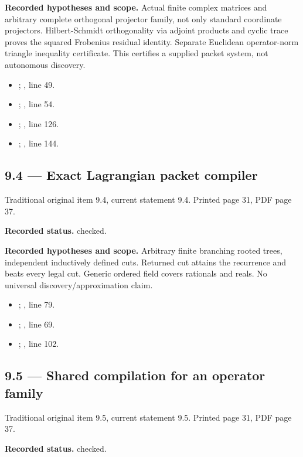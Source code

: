 \textbf{Recorded hypotheses and scope.} Actual finite complex matrices and arbitrary complete orthogonal projector family, not only standard coordinate projectors. Hilbert-Schmidt orthogonality via adjoint products and cyclic trace proves the squared Frobenius residual identity. Separate Euclidean operator-norm triangle inequality certificate. This certifies a supplied packet system, not autonomous discovery.

\begin{itemize}
\item {}; , line 49.
\item {}; , line 54.
\item {}; , line 126.
\item {}; , line 144.
\end{itemize}
\subsection{9.4 — Exact Lagrangian packet compiler}
\label{result:9.4}
{\footnotesize\color{muted}Traditional original item 9.4, current statement 9.4. Printed page 31, PDF page 37.}\par
\textbf{Recorded status.} checked.

\textbf{Recorded hypotheses and scope.} Arbitrary finite branching rooted trees, independent inductively defined cuts. Returned cut attains the recurrence and beats every legal cut. Generic ordered field covers rationals and reals. No universal discovery/approximation claim.

\begin{itemize}
\item {}; , line 79.
\item {}; , line 69.
\item {}; , line 102.
\end{itemize}
\subsection{9.5 — Shared compilation for an operator family}
\label{result:9.5}
{\footnotesize\color{muted}Traditional original item 9.5, current statement 9.5. Printed page 31, PDF page 37.}\par
\textbf{Recorded status.} checked.

